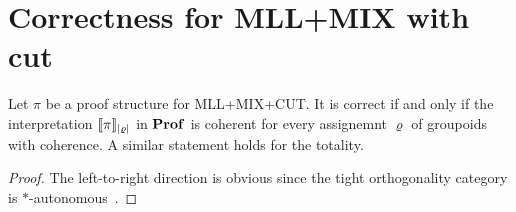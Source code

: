 \section{Correctness for MLL+MIX with \textsf{cut}}




\begin{theorem}
    Let \( \pi \) be a proof structure for \textsf{MLL+MIX+CUT}.
    It is correct if and only if the interpretation \( \llbracket{\pi}\rrbracket_{|\varrho|} \) in \( \mathbf{Prof} \) is coherent for every assignemnt \( \varrho \) of groupoids with coherence.
    A similar statement holds for the totality.
\end{theorem}
\begin{proof}
    The left-to-right direction is obvious since the tight orthogonality category is \( * \)-autonomous~\cite{Hyland2003}.
\end{proof}
